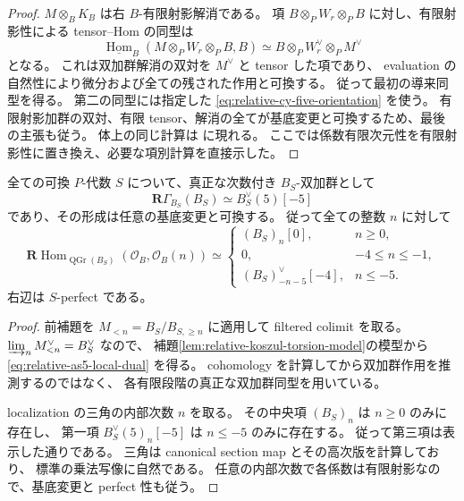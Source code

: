 \begin{proof}
$M\otimes_BK_B$ は右 $B$-有限射影解消である。
項 $B\otimes_PW_r\otimes_PB$ に対し、有限射影性による tensor--Hom の同型は
\[
 \underline{\operatorname{Hom}}_B
       (M\otimes_PW_r\otimes_PB,B)
 \simeq B\otimes_PW_r^\vee\otimes_PM^\vee
\]
となる。
これは双加群解消の双対を $M^\vee$ と tensor した項であり、
evaluation の自然性により微分および全ての残された作用と可換する。
従って最初の導来同型を得る。
第二の同型には指定した \eqref{eq:relative-cy-five-orientation} を使う。
有限射影加群の双対、有限 tensor、解消の全てが基底変更と可換するため、最後の主張も従う。
体上の同じ計算は \cite[Proposition~4.12]{RRGeneralizedAS} に現れる。
ここでは係数有限次元性を有限射影性に置き換え、必要な項別計算を直接示した。
\end{proof}

\begin{proposition}[周囲代数の相対局所コホモロジー]
\label{prop:relative-as5-local-cohomology}
全ての可換 $P$-代数 $S$ について、真正な次数付き $B_S$-双加群として
\begin{equation}\label{eq:relative-as5-local-dual}
 \mathbf R\Gamma_{B_S}(B_S)\simeq B_S^\vee(5)[-5]
\end{equation}
であり、その形成は任意の基底変更と可換する。
従って全ての整数 $n$ に対して
\[
 \mathbf R\operatorname{Hom}_{\operatorname{QGr}(B_S)}
       (\mathcal O_B,\mathcal O_B(n))
 \simeq
 \begin{cases}
  (B_S)_n[0],&n\geq0,\\
  0,&-4\leq n\leq-1,\\
  (B_S)_{-n-5}^\vee[-4],&n\leq-5.
 \end{cases}
\]
右辺は $S$-perfect である。
\end{proposition}

\begin{proof}
前補題を $M_{<n}=B_S/B_{S,\geq n}$ に適用して filtered colimit を取る。
$\varinjlim_nM_{<n}^\vee=B_S^\vee$ なので、
補題\ref{lem:relative-koszul-torsion-model}の模型から
\eqref{eq:relative-as5-local-dual} を得る。
cohomology を計算してから双加群作用を推測するのではなく、
各有限段階の真正な双加群同型を用いている。

localization の三角の内部次数 $n$ を取る。
その中央項 $(B_S)_n$ は $n\geq0$ のみに存在し、
第一項 $B_S^\vee(5)_n[-5]$ は $n\leq-5$ のみに存在する。
従って第三項は表示した通りである。
三角は canonical section map とその高次版を計算しており、
標準の乗法写像に自然である。
任意の内部次数で各係数は有限射影なので、基底変更と perfect 性も従う。
\end{proof}

